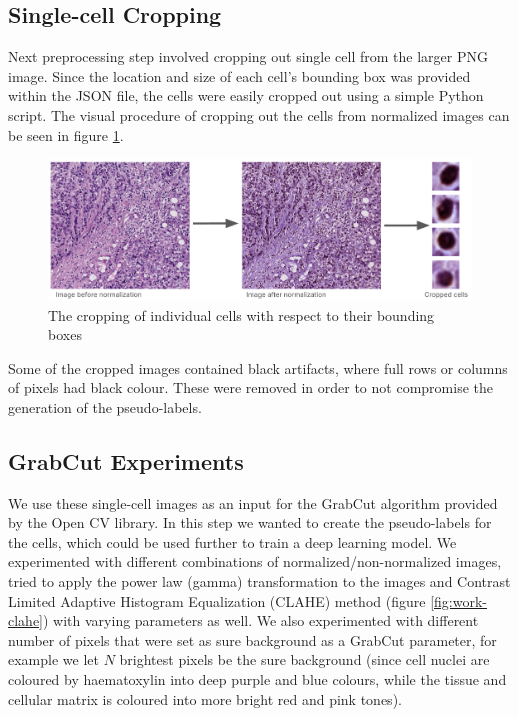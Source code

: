 \subsection{Single-cell Cropping}
Next preprocessing step involved cropping out single cell from the larger PNG image. Since the location and size of each cell's bounding box was provided within the JSON file, the cells were easily cropped out using a simple Python script. The visual procedure of cropping out the cells from normalized images can be seen in figure \ref{fig:work-cell-crop}.

\begin{figure}[H]
    \begin{centering}
    \includegraphics[width=14cm]{assets/images/work-cell-cropping.png}
    \par\end{centering}
    \caption{The cropping of individual cells with respect to their bounding boxes}
    \label{fig:work-cell-crop}
\end{figure}

Some of the cropped images contained black artifacts, where full rows or columns of pixels had black colour. These were removed in order to not compromise the generation of the pseudo-labels.

\subsection{GrabCut Experiments}
We use these single-cell images as an input for the GrabCut algorithm provided by the Open CV library. In this step we wanted to create the pseudo-labels for the cells, which could be used further to train a deep learning model. We experimented with different combinations of normalized/non-normalized images, tried to apply the power law (gamma) transformation to the images and Contrast Limited Adaptive Histogram Equalization (CLAHE) method (figure \ref{fig:work-clahe}) with varying parameters as well. We also experimented with different number of pixels that were set as sure background as a GrabCut parameter, for example we let $N$ brightest pixels be the sure background (since cell nuclei are coloured by haematoxylin into deep purple and blue colours, while the tissue and cellular matrix is coloured into more bright red and pink tones). 

